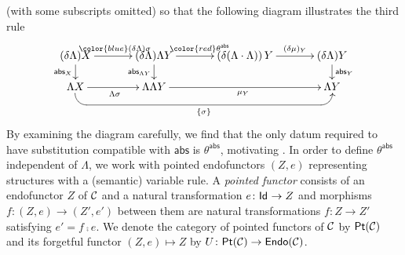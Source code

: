 \documentclass[acmsmall,review]{acmart}\settopmatter{printfolios=true,printccs=false,printacmref=false}
\theoremstyle{acmdefinition}
\begin{document}
(with some subscripts omitted) so that the following diagram illustrates the third rule
\[
  \vcenter{
    \xymatrix@C+1em@R-1em{
      (\delta \Lambda) X \ar[r]^{\color{blue}(\delta\Lambda) \sigma} \ar[d]_{\mathsf{abs}_X} & (\delta \Lambda)\Lambda Y \ar[r]^{\color{red}\theta^{\mathsf{abs}}} \ar[d]_{\mathsf{abs}_{\Lambda Y}} &
      \left(\delta (\Lambda \fcomp \Lambda)\right) Y \ar[r]^-{(\delta\mu)_Y}& (\delta \Lambda) Y \ar[d]^{\mathsf{abs}_Y} \\
      \Lambda X \ar[r]_{\Lambda\sigma} \ar@<-.1ex> `d[r] `[rrr]_{\subst{\sigma}} [rrr] & \Lambda \Lambda Y \ar[rr]_{\mu_Y} & & \Lambda Y
    }
  }
\]
By examining the diagram carefully, we find that the only datum required to have substitution compatible with $\mathsf{abs}$ is $\theta^{\mathsf{abs}}$, motivating .
In order to define $\theta^{\mathsf{abs}}$ independent of $\Lambda$, we work with pointed endofunctors $(Z, e)$ representing structures with a (semantic) variable rule.
A \emph{pointed functor} consists of an endofunctor $Z$ of $\mathcal{C}$ and a natural transformation $e\colon \mathsf{Id}_{} \to Z$ and morphisms $f\colon (Z, e) \to (Z', e')$ between them are natural transformations $f\colon Z \to Z'$ satisfying $e' = f \comp e$.
We denote the category of pointed functors of $\mathcal{C}$ by $\mathsf{Pt}({\mathcal{C}})$ and its forgetful functor $(Z, e) \mapsto Z$ by $U\colon \mathsf{Pt}({\mathcal{C}})\to \mathsf{Endo}({\mathcal{C}})$.
\end{document}
